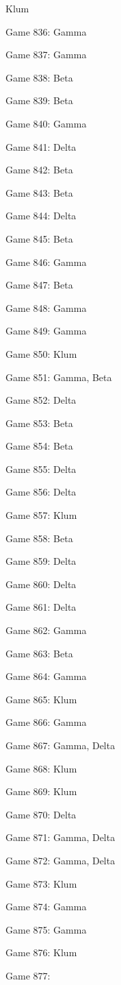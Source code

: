 \documentclass{article}
\begin{document}
\begin{multicols}{3}
\begin{compactitem}
Klum
\item Game 836:
Gamma
\item Game 837:
Gamma
\item Game 838:
Beta
\item Game 839:
Beta
\item Game 840:
Gamma
\item Game 841:
Delta
\item Game 842:
Beta
\item Game 843:
Beta
\item Game 844:
Delta
\item Game 845:
Beta
\item Game 846:
Gamma
\item Game 847:
Beta
\item Game 848:
Gamma
\item Game 849:
Gamma
\item Game 850:
Klum
\item Game 851:
Gamma, Beta
\item Game 852:
Delta
\item Game 853:
Beta
\item Game 854:
Beta
\item Game 855:
Delta
\item Game 856:
Delta
\item Game 857:
Klum
\item Game 858:
Beta
\item Game 859:
Delta
\item Game 860:
Delta
\item Game 861:
Delta
\item Game 862:
Gamma
\item Game 863:
Beta
\item Game 864:
Gamma
\item Game 865:
Klum
\item Game 866:
Gamma
\item Game 867:
Gamma, Delta
\item Game 868:
Klum
\item Game 869:
Klum
\item Game 870:
Delta
\item Game 871:
Gamma, Delta
\item Game 872:
Gamma, Delta
\item Game 873:
Klum
\item Game 874:
Gamma
\item Game 875:
Gamma
\item Game 876:
Klum
\item Game 877:

\end{compactitem}
\end{multicols}
\end{document}
